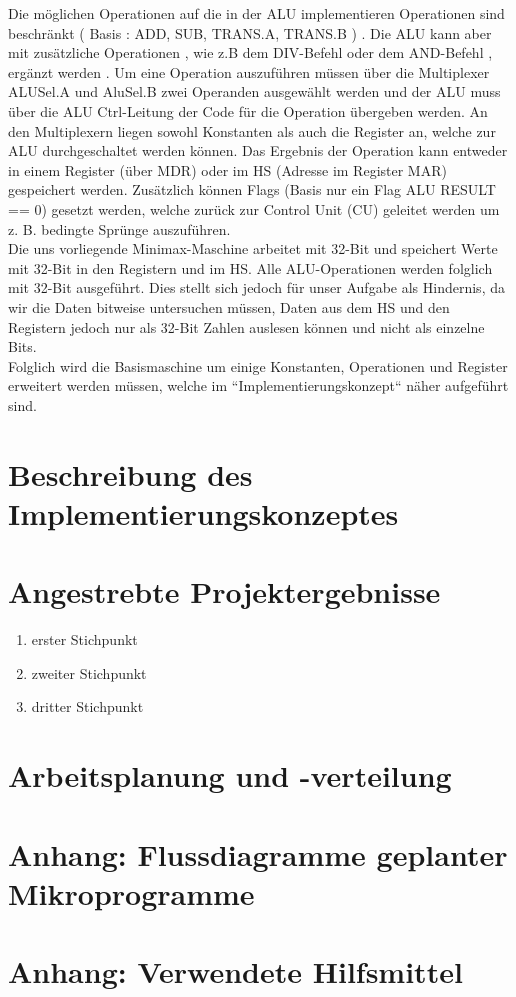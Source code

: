 \documentclass[12pt,titlepage,german,a4]{article}
\begin{document}
    Die m{\"o}glichen Operationen auf die in der ALU implementieren Operationen sind beschr{\"a}nkt ( Basis :  ADD, SUB, TRANS.A, TRANS.B ) . Die ALU kann aber mit zus{\"a}tzliche Operationen , wie z.B dem DIV-Befehl oder dem AND-Befehl , erg{\"a}nzt werden .
    Um eine Operation auszuf{\"u}hren m{\"u}ssen {\"u}ber die Multiplexer ALUSel.A und AluSel.B zwei
    Operanden ausgew{\"a}hlt werden und der ALU muss {\"u}ber die ALU Ctrl-Leitung der Code
    f{\"u}r die Operation {\"u}bergeben werden. An den Multiplexern liegen sowohl Konstanten als
    auch die Register an, welche zur ALU durchgeschaltet werden k{\"o}nnen. Das Ergebnis der
    Operation kann entweder in einem Register ({\"u}ber MDR) oder im HS (Adresse im Register
    MAR) gespeichert werden. Zus{\"a}tzlich k{\"o}nnen Flags (Basis nur ein Flag ALU RESULT ==
    0) gesetzt werden, welche zur{\"u}ck zur Control Unit (CU) geleitet werden um z. B. bedingte
    Spr{\"u}nge auszuf{\"u}hren. \\
    Die uns vorliegende Minimax-Maschine arbeitet mit 32-Bit und speichert Werte mit
    32-Bit in den Registern und im HS. Alle ALU-Operationen werden folglich mit 32-Bit ausgef{\"u}hrt. Dies stellt sich jedoch f{\"u}r unser Aufgabe als Hindernis, da wir die Daten
    bitweise untersuchen m{\"u}ssen, Daten aus dem HS und den Registern jedoch nur als 32-Bit
    Zahlen auslesen k{\"o}nnen und nicht als einzelne Bits.\\
    Folglich wird die Basismaschine um einige Konstanten, Operationen und Register erweitert
    werden m{\"u}ssen, welche im “Implementierungskonzept“ n{\"a}her aufgef{\"u}hrt sind.

    \section{Beschreibung des Implementierungskonzeptes}

    \section{Angestrebte Projektergebnisse}
        \begin{enumerate}
            \item erster Stichpunkt
            \item zweiter Stichpunkt
            \item dritter Stichpunkt
        \end{enumerate}
    \section{Arbeitsplanung und -verteilung}

    \section{Anhang: Flussdiagramme geplanter Mikroprogramme}

    \section{Anhang: Verwendete Hilfsmittel}
\end{document}
